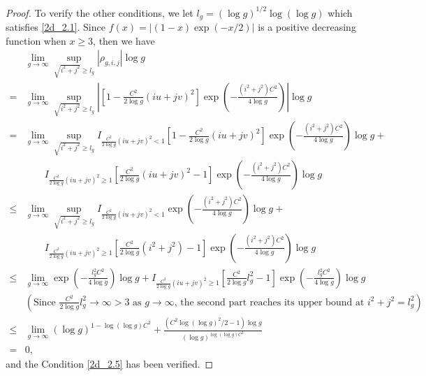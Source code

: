\documentclass{article}
\begin{document}
\begin{appendices}
\begin{proof}
		To verify the other conditions, we let $l_g=(\log g)^{1/2}\log(\log g)$ which satisfies \eqref{2d_2.1}. Since $f(x)=|(1-x)\exp(-x/2)|$ is a positive decreasing function when $x\geq 3$, then we have
		\begin{equation*}
			\begin{aligned}
				&\lim_{g \to \infty} \sup_{\sqrt{i^2+j^2} \geq l_g} |\rho_{g,i,j}| \log g\\
				=&\lim_{g \to \infty} \sup_{\sqrt{i^2+j^2} \geq l_g}|[1-\frac{C^2}{2\log g}(iu+jv)^2]\exp(-\frac{(i^2+j^2)C^2}{4\log g})|\log g\\
				=&\lim_{g \to \infty} \sup_{\sqrt{i^2+j^2} \geq l_g}I_{\frac{C^2}{2\log g}(iu+jv)^2<1}[1-\frac{C^2}{2\log g}(iu+jv)^2]\exp(-\frac{(i^2+j^2)C^2}{4\log g})\log g+\\
				&\qquad I_{\frac{C^2}{2\log g}(iu+jv)^2\geq 1}[\frac{C^2}{2\log g}(iu+jv)^2-1]\exp(-\frac{(i^2+j^2)C^2}{4\log g})\log g\\
				\leq&\lim_{g \to \infty} \sup_{\sqrt{i^2+j^2} \geq l_g}I_{\frac{C^2}{2\log g}(iu+jv)^2<1}\exp(-\frac{(i^2+j^2)C^2}{4\log g})\log g+\\
				&\qquad I_{\frac{C^2}{2\log g}(iu+jv)^2\geq 1}[\frac{C^2}{2\log g}(i^2+j^2)-1]\exp(-\frac{(i^2+j^2)C^2}{4\log g})\log g\\
				\leq&\lim_{g \to \infty} \exp(-\frac{l_g^2C^2}{4\log g})\log g+ I_{\frac{C^2}{2\log g}(iu+jv)^2\geq 1}[\frac{C^2}{2\log g}l_g^2-1]\exp(-\frac{l_g^2C^2}{4\log g})\log g\\
				&(\text{Since }\frac{C^2}{2\log g}l_g^2\rightarrow\infty>3\text { as } g\rightarrow\infty\text{, the second part reaches its upper bound at }i^2+j^2= l_g^2) \\
				\leq&\lim_{g \to \infty}(\log g)^{1-\log(\log g)C^2}+\frac{(C^2\log(\log g)^2/2-1)\log g}{(\log g)^{\log(\log g)C^2}} \\
				=&0,
			\end{aligned} 
		\end{equation*}
		and the Condition \ref{2d_2.5} has been verified.
		

\end{proof}
\end{appendices}
\end{document}
